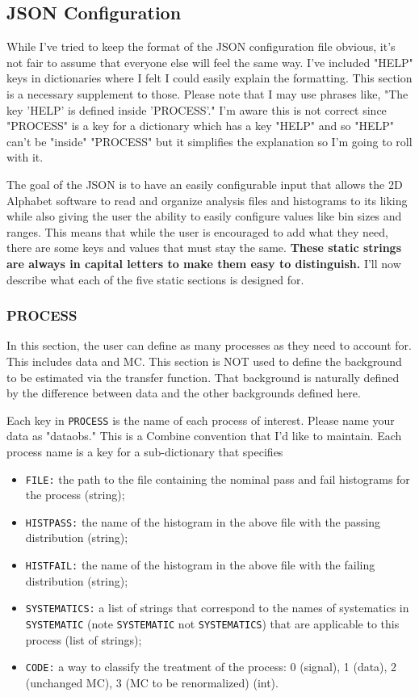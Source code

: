 \documentclass[letter]{article}
\begin{document}
    \subsection{JSON Configuration}
        While I've tried to keep the format of the JSON configuration file obvious, it's not fair to assume that everyone else will feel the same way. I've included "HELP" keys in dictionaries where I felt I could easily explain the formatting. This section is a necessary supplement to those. Please note that I may use phrases like, "The key 'HELP' is defined inside 'PROCESS'." I'm aware this is not correct since "PROCESS" is a key for a dictionary which has a key "HELP" and so "HELP" can't be "inside" "PROCESS" but it simplifies the explanation so I'm going to roll with it.  

        The goal of the JSON is to have an easily configurable input that allows the 2D Alphabet software to read and organize analysis files and histograms to its liking while also giving the user the ability to easily configure values like bin sizes and ranges. This means that while the user is encouraged to add what they need, there are some keys and values that must stay the same. \textbf{These static strings are always in capital letters to make them easy to distinguish.} I'll now describe what each of the five static sections is designed for.

        \subsubsection{PROCESS}
            In this section, the user can define as many processes as they need to account for. This includes data and MC. This section is NOT used to define the background to be estimated via the transfer function. That background is naturally defined by the difference between data and the other backgrounds defined here.

            Each key in \verb"PROCESS" is the name of each process of interest. Please name your data as "data\textunderscore obs." This is a Combine convention that I'd like to maintain. Each process name is a key for a sub-dictionary that specifies
            \begin{itemize}
                \item \verb"FILE:" the path to the file containing the nominal pass and fail histograms for the process (string);
                \item \verb"HISTPASS:" the name of the histogram in the above file with the passing distribution (string);
                \item \verb"HISTFAIL:" the name of the histogram in the above file with the failing distribution (string);
                \item \verb"SYSTEMATICS:" a list of strings that correspond to the names of systematics in \verb"SYSTEMATIC" (note \verb"SYSTEMATIC" not \verb"SYSTEMATICS") that are applicable to this process (list of strings);
                \item \verb"CODE:" a way to classify the treatment of the process: 0 (signal), 1 (data), 2 (unchanged MC), 3 (MC to be renormalized) (int).
            \end{itemize} 
\end{document}
